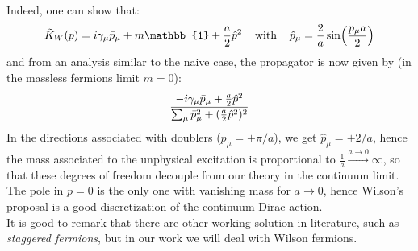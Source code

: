 \\ Indeed, one can show that:
\begin{equation}
    \Tilde{K}_W (p) = i \gamma_\mu \Bar{p}_\mu + m\mathbb{1} + \frac{a}{2} \hat{p}^2 \hspace{4mm} \mbox{with} \hspace{4 mm} \hat{p}_\mu = \frac{2}{a} \sin(\frac{p_\mu a}{2})
\end{equation}
and from an analysis similar to the naive case, the propagator is now given by (in the massless fermions limit $m = 0$):
\begin{equation}
    \frac{-i \gamma_\mu \Bar{p}_\mu + \frac{a}{2} \hat{p}^2}{\sum_\mu \Bar{p}_\mu^2 + (\frac{a}{2} \hat{p}^2)^2}
\end{equation}
In the directions associated with doublers ($p_\mu = \pm \pi/a$), we get $\hat{p}_\mu = \pm 2/a$, hence the mass associated to the unphysical excitation is proportional to $\frac{1}{a} \xrightarrow{a \to 0} \infty$, so that these degrees of freedom decouple from our theory in the continuum limit. The pole in $p = 0$ is the only one with vanishing mass for $a \to 0$, hence Wilson's proposal is a good discretization of the continuum Dirac action.
\\ It is good to remark that there are other working solution in literature, such as \textit{staggered fermions}, but in our work we will deal with Wilson fermions.

